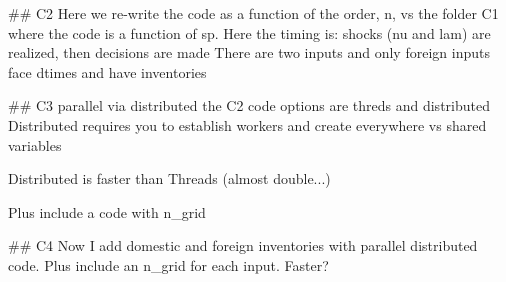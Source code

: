 
##
C2
Here we re-write the code as a function of the order, n, vs the folder C1 where the code is a function of sp.
Here the timing is: shocks (nu and lam) are realized, then decisions are made
There are two inputs and only foreign inputs face dtimes and have inventories


##
C3
parallel via distributed the C2 code
 options are threds and distributed
 Distributed requires you to establish workers and create everywhere vs shared variables

 Distributed is faster than Threads (almost double...)

 Plus include a code with n_grid 

##
C4
Now I add domestic and foreign inventories with parallel distributed code.
Plus include an n_grid for each input. Faster? 







